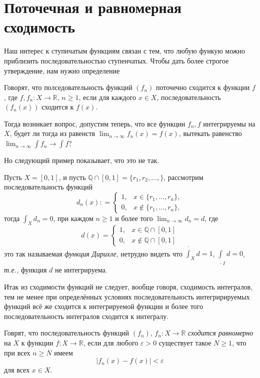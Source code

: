 \section{Поточечная и равномерная сходимость}

Наш интерес к ступнчатым функциям связан с тем, что любую функую можно приблизить последовательностью ступенчатых. Чтобы дать более строгое утверждение, нам нужно определение

\begin{definition}
    Говорят, что полседовательность функций $(f_n)$ поточечно сходится к функции $f$, где $f, f_n : X \to \mathbb{R}$, $n\ge 1$, если для каждого $x \in X$, последовательность $(f_n(x))$ сходится к $f(x)$.
\end{definition}

Тогда возникает вопрос, допустим теперь, что все функции $f_n, f$ интегрируемы на $X$, будет ли тогда из равенств $\lim_{n\to \infty} f_n(x) = f(x)$, вытекать равенство $\lim_{n\to \infty} \int f_n \to \int f$?

Но следующий пример показывает, что это не так.

\begin{example}
    Пусть $X = [0,1]$, и пусть $\mathbb{Q} \cap [0,1] = \{r_1,r_2,\ldots,\}$, рассмотрим последовательность функций 
    \[
     d_n(x): = \begin{cases}
         1, & x \in \{r_1,\ldots, r_n\},\\
         0, & x \notin\{r_1,\ldots, r_n\},
     \end{cases}
    \]
    тогда $\int_X d_n = 0$, при каждом $n \ge 1$ и более того $\lim_{n\to \infty} d_n =d$, где
    \[
     d(x) = \begin{cases}
         1, & x \in \mathbb{Q}\cap [0,1] \\
         0, & x \notin \mathbb{Q} \cap [0,1]
     \end{cases}
    \]
    это так называемая \textit{функция Дирихле}, нетрудно видеть что $\overline{\int}_X d = 1$, $\underline{\int}_I d  =0$, \textit{т.е.,} функция $d$ не интегрируема.
\end{example}

Итак из сходимости функций не следует, вообще говоря, сходимость интегралов, тем не менее при определённых условиях последовательность интегририруемых функций всё же сходится к интегрируемой функции и более того последовательность интегралов сходится к интегралу.

\begin{definition}
    Говрят, что последовательность функций $(f_n)$, $f_n:X \to \mathbb{R}$ \textit{сходится равномерно} на $X$ к функции $f:X \to \mathbb{R}$, если для любого $\varepsilon>0$ существует такое $N \ge 1$, что при всех $n \ge N$ имеем
    \[
     |f_n(x) -f(x)| <\varepsilon
    \]
    для всех $x \in X.$
\end{definition}

